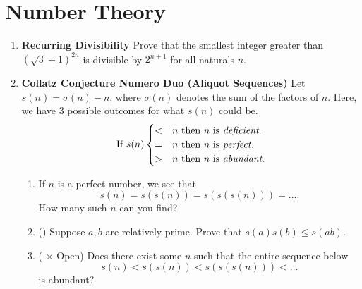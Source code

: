 \documentclass[11pt]{scrartcl}
\begin{document}
\newpage
\section{Number Theory}
\begin{enumerate}[label=\textbf{N\arabic*}.]
    \item \textbf{Recurring Divisibility} \newline
    Prove that the smallest integer greater than $(\sqrt{3} + 1)^{2n}$ is divisible by $2^{n+1}$ for all naturals $n$.
    
    \item \textbf{Collatz Conjecture Numero Duo (Aliquot Sequences)} \newline
    Let $s(n) = \sigma(n) - n$, where $\sigma(n)$ denotes the sum of the factors of $n$. Here, we have $3$ possible outcomes for what $s(n)$ could be.
    \[ \text{If } s(n) \begin{cases} < & n \text{ then $n$ is \textit{deficient}.} \\ = & n \text{ then $n$ is \textit{perfect}.} \\ > & n \text{ then $n$ is \textit{abundant}.} \end{cases} \]
    
    \begin{enumerate}
        \item If $n$ is a perfect number, we see that
        \[ s(n) = s(s(n)) = s(s(s(n))) = \dots. \]
        How many such $n$ can you find?
        
        \item (\halfchili) Suppose $a, b$ are relatively prime. Prove that $s(a)s(b) \leq s(ab)$.
        
        \item (\fullchili \hspace{1pt} $\times$ Open) Does there exist some $n$ such that the entire sequence below
        \[ s(n) < s(s(n)) < s(s(s(n))) < \dots \]
        is abundant?
    \end{enumerate}
    
\end{enumerate}
\end{document}
